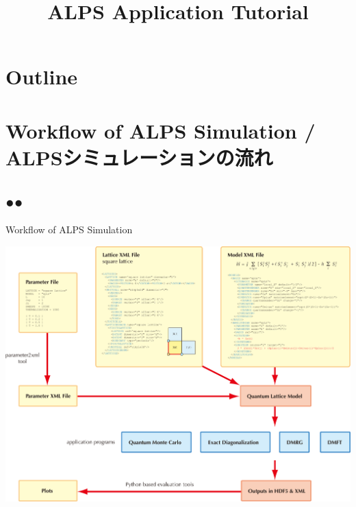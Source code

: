 \title{ALPS Application Tutorial}




\begin{frame}
  \titlepage
\end{frame}

\section*{Outline}
\begin{frame}
   \tableofcontents
\end{frame}

\section{Workflow of ALPS Simulation / ALPSシミュレーションの流れ}
\subsection*{{\protect\color{red}●}{\protect\color{blue}●}}

\begin{frame}{Workflow of ALPS Simulation}
  \begin{center}
    \includegraphics[height=0.8\textheight]{workflow.pdf}
  \end{center}
\end{frame}

